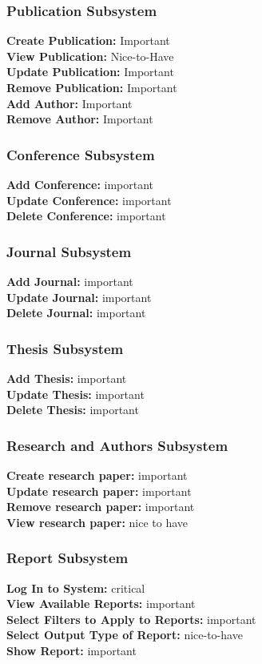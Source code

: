 \documentclass{article}
\begin{document}
			\subsubsection{Publication Subsystem}
			\textbf{Create Publication:} Important\\
			\textbf{View Publication:} Nice-to-Have\\
			\textbf{Update Publication:} Important\\
			\textbf{Remove Publication:} Important\\
			\textbf{Add Author:} Important\\
			\textbf{Remove Author:} Important\\
			\subsubsection{Conference Subsystem}
				\textbf{Add Conference:} important\\
				\textbf{Update Conference:} important\\
				\textbf{Delete Conference:} important
			\subsubsection{Journal Subsystem}
				\textbf{Add Journal:} important\\
				\textbf{Update Journal:} important\\
				\textbf{Delete Journal:} important
			\subsubsection{Thesis Subsystem}
				\textbf{Add Thesis:} important\\
				\textbf{Update Thesis:} important\\
				\textbf{Delete Thesis:} important
			\subsubsection{Research and Authors Subsystem}
				\textbf{Create research paper:} important\\
				\textbf{Update research paper:} important\\
				\textbf{Remove research paper:} important\\
				\textbf{View research paper:} nice to have\\
			\subsubsection{Report Subsystem}
				\textbf{Log In to System:} critical\\
				\textbf{View Available Reports:} important\\
				\textbf{Select Filters to Apply to Reports:} important\\
				\textbf{Select Output Type of Report:} nice-to-have\\
				\textbf{Show Report:} important\\
\end{document}
